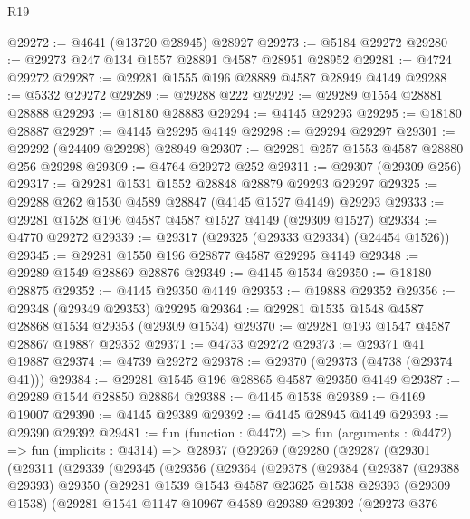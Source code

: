 \begin{lexlean}{R19}
\begin{coremodule}
@29272 := @4641 (@13720 @28945) @28927
@29273 := @5184 @29272
@29280 := @29273 @247 @134 @1557 @28891 @4587 @28951 @28952
@29281 := @4724 @29272
@29287 := @29281 @1555 @196 @28889 @4587 @28949 @4149
@29288 := @5332 @29272
@29289 := @29288 @222
@29292 := @29289 @1554 @28881 @28888
@29293 := @18180 @28883
@29294 := @4145 @29293
@29295 := @18180 @28887
@29297 := @4145 @29295 @4149
@29298 := @29294 @29297
@29301 := @29292 (@24409 @29298) @28949
@29307 := @29281 @257 @1553 @4587 @28880 @256 @29298
@29309 := @4764 @29272 @252
@29311 := @29307 (@29309 @256)
@29317 := @29281 @1531 @1552 @28848 @28879 @29293 @29297
@29325 := @29288 @262 @1530 @4589 @28847 (@4145 @1527 @4149) @29293
@29333 := @29281 @1528 @196 @4587 @4587 @1527 @4149 (@29309 @1527)
@29334 := @4770 @29272
@29339 := @29317 (@29325 (@29333 @29334) (@24454 @1526))
@29345 := @29281 @1550 @196 @28877 @4587 @29295 @4149
@29348 := @29289 @1549 @28869 @28876
@29349 := @4145 @1534
@29350 := @18180 @28875
@29352 := @4145 @29350 @4149
@29353 := @19888 @29352
@29356 := @29348 (@29349 @29353) @29295
@29364 := @29281 @1535 @1548 @4587 @28868 @1534 @29353 (@29309 @1534)
@29370 := @29281 @193 @1547 @4587 @28867 @19887 @29352
@29371 := @4733 @29272
@29373 := @29371 @41 @19887
@29374 := @4739 @29272
@29378 := @29370 (@29373 (@4738 (@29374 @41)))
@29384 := @29281 @1545 @196 @28865 @4587 @29350 @4149
@29387 := @29289 @1544 @28850 @28864
@29388 := @4145 @1538
@29389 := @4169 @19007
@29390 := @4145 @29389
@29392 := @4145 @28945 @4149
@29393 := @29390 @29392
@29481 := fun (function : @4472) =>
  fun (arguments : @4472) =>
  fun (implicits : @4314) =>
  @28937
    (@29269
      (@29280
        (@29287
          (@29301
            (@29311
              (@29339
                (@29345
                  (@29356
                    (@29364
                      (@29378
                        (@29384
                          (@29387
                            (@29388 @29393)
                            @29350
                            (@29281
                              @1539
                              @1543
                              @4587
                              @23625
                              @1538
                              @29393
                              (@29309 @1538)
                              (@29281
                                @1541
                                @1147
                                @10967
                                @4589
                                @29389
                                @29392
                                (@29273
                                  @376

\end{coremodule}
\end{lexlean}
